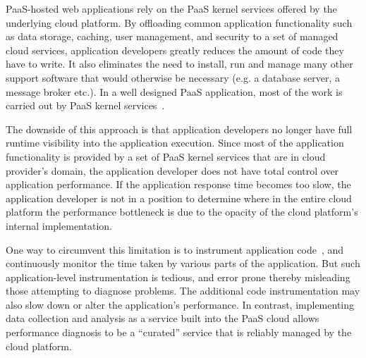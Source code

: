 PaaS-hosted web applications rely on the PaaS kernel services offered by the underlying
cloud platform. By offloading common application functionality such as data storage, caching,
user management, and security to a set of managed cloud services, application developers
greatly reduces the amount of code they have to write. It also eliminates the need to install, run and
manage many other support software that would otherwise be necessary (e.g. a database server, 
a message broker etc.). In a well designed PaaS application, most of the work is carried out
by PaaS kernel services~\cite{Jayathilaka:2015:RTS:2806777.2806842}.

The downside of this approach is that application developers no longer have full runtime visibility
into the application execution. Since most of the application functionality is provided by a set 
of PaaS kernel services that are in cloud provider's domain, the application
developer does not have total control over application performance. If the application 
response time becomes too slow, the application developer is not in a position to determine
where in the entire cloud platform the performance bottleneck is due to the opacity of the cloud
platform's internal implementation. 

One way to circumvent this 
limitation is to instrument application code~\cite{newrelic,datadog,dynatrace}, 
and continuously monitor the time taken by various
parts of the application. But such application-level instrumentation is tedious, and
error prone thereby misleading those attempting to diagnose problems.
The additional code instrumentation may also slow down or alter the application's
performance. 
In contrast, implementing data collection and analysis as a service built into the PaaS cloud allows 
performance diagnosis to be a ``curated'' service that is 
reliably managed by the cloud platform.

